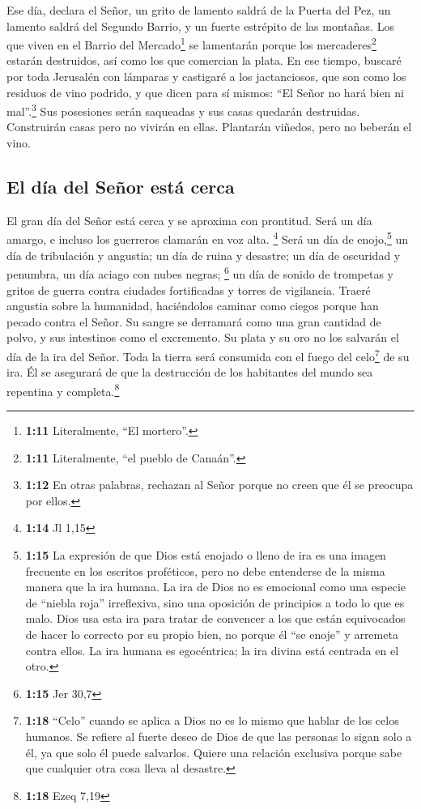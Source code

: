  Ese día, declara el Señor, un grito de lamento saldrá de
la Puerta del Pez, un lamento saldrá del Segundo Barrio, y un fuerte
estrépito de las montañas.  Los que viven en el Barrio
del Mercado\footnote{\textbf{1:11} Literalmente, ``El mortero''.} se
lamentarán porque los mercaderes\footnote{\textbf{1:11} Literalmente,
  ``el pueblo de Canaán''.} estarán destruidos, así como los que
comercian la plata.  En ese tiempo, buscaré por toda
Jerusalén con lámparas y castigaré a los jactanciosos, que son como los
residuos de vino podrido, y que dicen para sí mismos: ``El Señor no hará
bien ni mal''.\footnote{\textbf{1:12} En otras palabras, rechazan al
  Señor porque no creen que él se preocupa por ellos.} 
Sus posesiones serán saqueadas y sus casas quedarán destruidas.
Construirán casas pero no vivirán en ellas. Plantarán viñedos, pero no
beberán el vino.

\hypertarget{el-duxeda-del-seuxf1or-estuxe1-cerca}{%
\subsection{El día del Señor está
cerca}\label{el-duxeda-del-seuxf1or-estuxe1-cerca}}

 El gran día del Señor está cerca y se aproxima con
prontitud. Será un día amargo, e incluso los guerreros clamarán en voz
alta. \footnote{\textbf{1:14} Jl 1,15}  Será un día de
enojo,\footnote{\textbf{1:15} La expresión de que Dios está enojado o
  lleno de ira es una imagen frecuente en los escritos proféticos, pero
  no debe entenderse de la misma manera que la ira humana. La ira de
  Dios no es emocional como una especie de ``niebla roja'' irreflexiva,
  sino una oposición de principios a todo lo que es malo. Dios usa esta
  ira para tratar de convencer a los que están equivocados de hacer lo
  correcto por su propio bien, no porque él ``se enoje'' y arremeta
  contra ellos. La ira humana es egocéntrica; la ira divina está
  centrada en el otro.} un día de tribulación y angustia; un día de
ruina y desastre; un día de oscuridad y penumbra, un día aciago con
nubes negras; \footnote{\textbf{1:15} Jer 30,7}  un día
de sonido de trompetas y gritos de guerra contra ciudades fortificadas y
torres de vigilancia.  Traeré angustia sobre la
humanidad, haciéndolos caminar como ciegos porque han pecado contra el
Señor. Su sangre se derramará como una gran cantidad de polvo, y sus
intestinos como el excremento.  Su plata y su oro no los
salvarán el día de la ira del Señor. Toda la tierra será consumida con
el fuego del celo\footnote{\textbf{1:18} ``Celo'' cuando se aplica a
  Dios no es lo mismo que hablar de los celos humanos. Se refiere al
  fuerte deseo de Dios de que las personas lo sigan solo a él, ya que
  solo él puede salvarlos. Quiere una relación exclusiva porque sabe que
  cualquier otra cosa lleva al desastre.} de su ira. Él se asegurará de
que la destrucción de los habitantes del mundo sea repentina y
completa.\footnote{\textbf{1:18} Ezeq 7,19}

